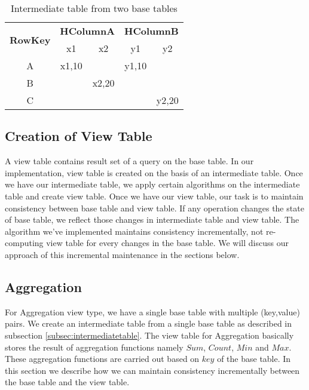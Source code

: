 \documentclass[11pt,a4paper,bibtotoc,idxtotoc,headsepline,footsepline,footexclude,BCOR12mm,DIV13]{scrbook}
\begin{document}
\begin{table*}[htb!]
	\centering
	\begin{tabular}{|c|c|c|c|c|}
		\hline
		\multirow{2}{*}{\textbf{RowKey}} & \multicolumn{2}{l|}{\textbf{HColumnA}} & \multicolumn{2}{l|}{\textbf{HColumnB}} \\ 
		\cline{2-5} 
		& x1            & x2            & y1            & y2            \\ \hline
		A                       & x1,10         &               & y1,10         &               \\ \hline
		B                       &               & x2,20         &               &               \\ \hline
		C                       &               &               &               & y2,20         \\ \hline
	\end{tabular}
	\caption{Intermediate table from two base tables}
	\label{table:Intermediate Table}
\end{table*}

\subsection{Creation of View Table}
A view table contains result set of a query on the base table. In our implementation, view table is created on the basis of an intermediate table. Once we have our intermediate table, we apply certain algorithms on the intermediate table and create view table. Once we have our view table, our task is to maintain consistency between base table and view table. If any operation changes the state of base table, we reflect those changes in intermediate table and view table. The algorithm we've implemented maintains consistency incrementally, not re-computing view table for every changes in the base table. We will discuss our approach of this incremental maintenance in the sections below.

\newpage
\subsection{Aggregation}
\label{sec:aggregationImpl}

For Aggregation view type, we have a single base table with multiple (key,value) pairs. We create an intermediate table from a single base table as described in subsection \ref{subsec:intermediatetable}. The view table for Aggregation basically stores the result of aggregation functions namely $Sum$, $Count$, $Min$ and $Max$. These aggregation functions are carried out based on $key$ of the base table. In this section we describe how we can maintain consistency incrementally between the base table and the view table. 
\end{document}
